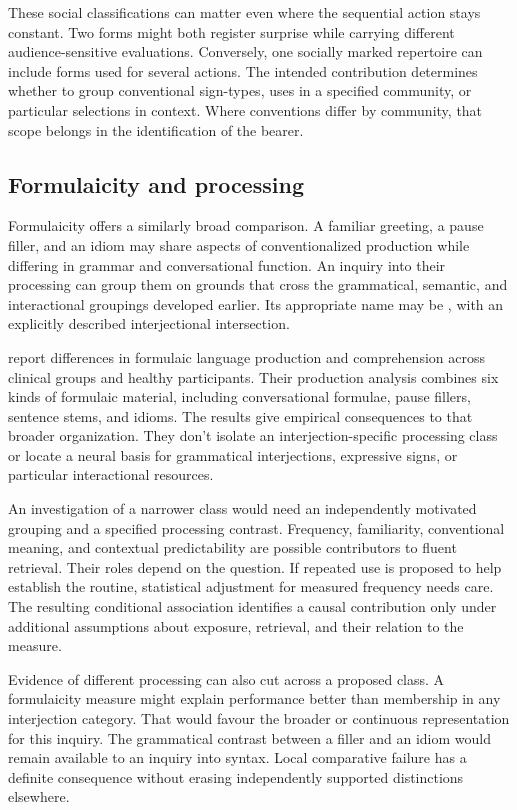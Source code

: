\documentclass[12pt]{article}
\begin{document}
These social classifications can matter even where the sequential
action stays constant. Two forms might both register surprise while
carrying different audience-sensitive evaluations. Conversely, one
socially marked repertoire can include forms used for several actions.
The intended contribution determines whether to group conventional
sign-types, uses in a specified community, or particular selections
in context. Where conventions differ by community, that scope belongs
in the identification of the bearer.

\subsection{Formulaicity and processing}

Formulaicity offers a similarly broad comparison. A familiar greeting,
a pause filler, and an idiom may share aspects of conventionalized
production while differing in grammar and conversational function.
An inquiry into their processing can group them on grounds that
cross the grammatical, semantic, and interactional groupings developed earlier. Its appropriate
name may be , with an explicitly described
interjectional intersection.

\textcite{vanlanckersidtis2015} report differences in formulaic
language production and comprehension across clinical groups and
healthy participants. Their production
analysis combines six kinds of formulaic material, including conversational
formulae, pause fillers, sentence stems, and idioms. The results give
empirical consequences to that broader organization. They don't
isolate an interjection-specific processing class or locate a neural
basis for grammatical interjections, expressive signs, or particular interactional resources.

An investigation of a narrower class would need an independently
motivated grouping and a specified processing contrast. Frequency,
familiarity, conventional meaning, and contextual predictability are
possible contributors to fluent retrieval. Their roles depend on
the question. If repeated use is proposed to help establish the
routine, statistical adjustment for measured frequency needs care.
The resulting conditional association identifies a causal contribution
only under additional assumptions about exposure, retrieval, and their
relation to the measure.

Evidence of different processing can also cut across a proposed
class. A formulaicity measure might explain performance better than
membership in any interjection category. That would favour the broader
or continuous representation for this inquiry. The grammatical contrast
between a filler and an idiom would remain available to an
inquiry into syntax. Local comparative failure has a definite consequence
without erasing independently supported distinctions elsewhere.
\end{document}

